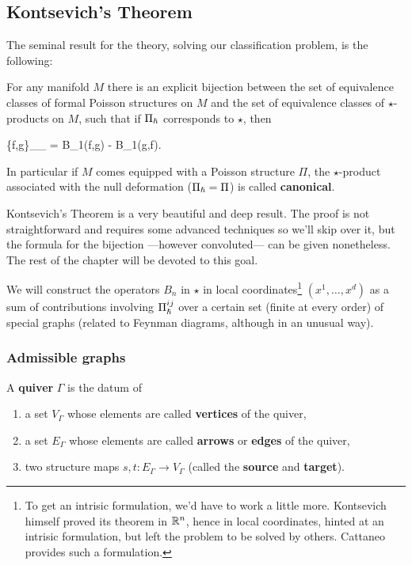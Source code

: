 \subsection{Kontsevich's Theorem}
The seminal result for the theory, solving our classification problem, is the following:

\begin{theorem}
	For any manifold $M$ there is an explicit bijection between the set of equivalence classes of formal Poisson structures on $M$ and the set of equivalence classes of $\star$-products on $M$, such that if $\Pi_{\boldsymbol\hslash}$ corresponds to $\star$, then
	\begin{eqalign}
	\label{eq:corr_condition}
		\{f,g\}_{\Pi_\planck} = B_1(f,g) - B_1(g,f).
	\end{eqalign}
	In particular if $M$ comes equipped with a Poisson structure $\Pi$, the $\star$-product associated with the null deformation ($\Pi_{\boldsymbol\hslash} = \Pi$) is called \textbf{canonical}.
\end{theorem}

Kontsevich's Theorem is a very beautiful and deep result. The proof is not straightforward and requires some advanced techniques so we'll skip over it, but the formula for the bijection ---however convoluted--- can be given nonetheless. The rest of the chapter will be devoted to this goal.

We will construct the operators $B_n$ in $\star$ in local coordinates\footnote{To get an intrisic formulation, we'd have to work a little more. Kontsevich himself proved its theorem in $\mathbb{R}^n$, hence in local coordinates, hinted at an intrisic formulation, but left the problem to be solved by others. Cattaneo provides such a formulation.} $(x^1, \ldots, x^d)$ as a sum of contributions involving $\Pi^{ij}_{\boldsymbol\hslash}$ over a certain set (finite at every order) of special graphs (related to Feynman diagrams, although in an unusual way).

\subsubsection{Admissible graphs}
\begin{definition}
	A \textbf{quiver} $\Gamma$ is the datum of
	\begin{enumerate}
		\item a set $V_\Gamma$ whose elements are called \textbf{vertices} of the quiver,
		\item a set $E_\Gamma$ whose elements are called \textbf{arrows} or \textbf{edges} of the quiver,
		\item two structure maps $s,t : E_\Gamma \to V_\Gamma$ (called the \textbf{source} and \textbf{target}).
	\end{enumerate}
\end{definition}

